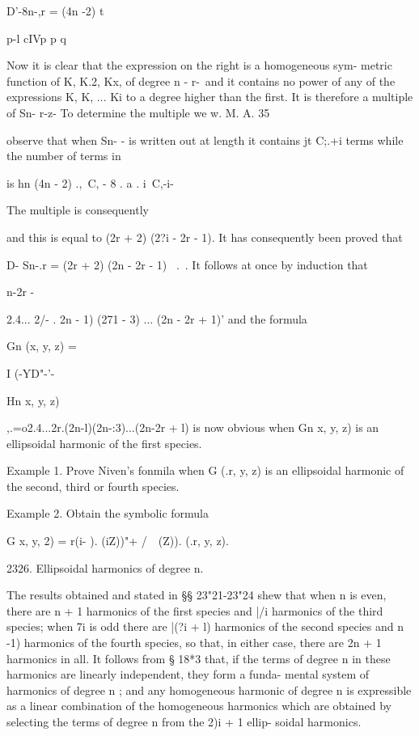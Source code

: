 {{D'-8n-,r = (4n -2) t

p-l cIVp p q

Now it is clear that the expression on the right is a homogeneous sym-
metric function of K, K.2, Kx, of degree n - r-\, and it contains
no power of any of the expressions K, K, ... Ki to a degree higher
than the first. It is therefore a multiple of Sn- r-z- To determine
the multiple we w. M. A. 35

%
%

observe that when Sn- - is written out at length it contains jt C;.+i
terms while the number of terms in

is hn (4n - 2) ., \,C, - 8 . a . i \,C,-i-

The multiple is consequently

and this is equal to (2r + 2) (2?i - 2r - 1). It has consequently been
proved that

D- Sn-.r = (2r + 2) (2n - 2r - 1) \ . \,. It follows at once by
induction that

 n-2r -

2.4... 2/- . 2n - 1) (271 - 3) ... (2n - 2r + 1)' and the formula

Gn (x, y, z) =

I (-YD"-'-

Hn x, y, z)

,.=o2.4...2r.(2n-l)(2n-:3)...(2n-2r + l) is now obvious when Gn x, y,
z) is an ellipsoidal harmonic of the first species.

Example 1. Prove Niven's fonmila when G (.r, y, z) is an ellipsoidal
harmonic of the second, third or fourth species.

Example 2. Obtain the symbolic formula

G x, y, 2) = r(i- ). (iZ))"+ /\ \ (Z)). (.r, y, z).

2326. Ellipsoidal harmonics of degree n.

The results obtained and stated in §§ 23"21-23"24 shew that when n is
even, there are n + 1 harmonics of the first species and |/i harmonics
of the third species; when 7i is odd there are |(?i + l) harmonics of
the second species and n -1) harmonics of the fourth species, so that,
in either case, there are 2n + 1 harmonics in all. It follows from §
18*3 that, if the terms of degree n in these harmonics are linearly
independent, they form a funda- mental system of harmonics of degree n
; and any homogeneous harmonic of degree n is expressible as a linear
combination of the homogeneous harmonics which are obtained by
selecting the terms of degree n from the 2)i + 1 ellip- soidal
harmonics.

}}
